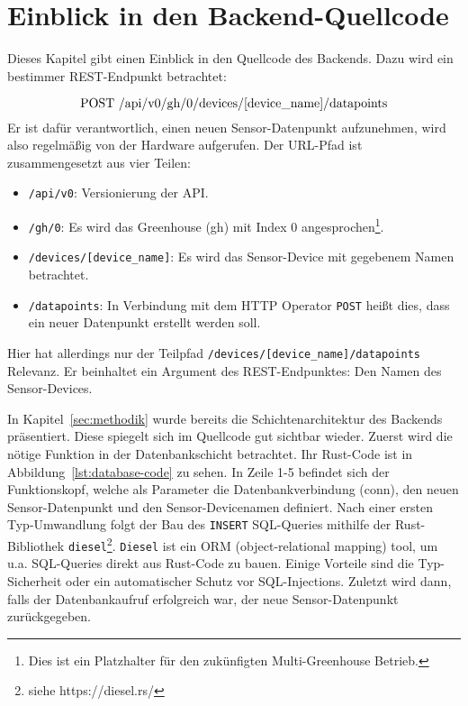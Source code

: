 \section{Einblick in den Backend-Quellcode}
    Dieses Kapitel gibt einen Einblick in den Quellcode des Backends.
    Dazu wird ein bestimmer REST-Endpunkt betrachtet:

    $$
        \text{\lstinline{POST /api/v0/gh/0/devices/[device_name]/datapoints}}
    $$
    Er ist dafür verantwortlich, einen neuen Sensor-Datenpunkt aufzunehmen, wird also regelmäßig von der Hardware aufgerufen.
    Der URL-Pfad ist zusammengesetzt aus vier Teilen:
    \begin{itemize}
        \item \lstinline{/api/v0}: Versionierung der API.
        \item \lstinline{/gh/0}: Es wird das Greenhouse (gh) mit Index 0 angesprochen\footnote{Dies ist ein Platzhalter für den zukünfigten Multi-Greenhouse Betrieb.}.
        \item \lstinline{/devices/[device_name]}: Es wird das Sensor-Device mit gegebenem Namen betrachtet.
        \item \lstinline{/datapoints}: In Verbindung mit dem HTTP Operator \lstinline{POST} heißt dies, dass ein neuer Datenpunkt erstellt werden soll.
    \end{itemize}
    Hier hat allerdings nur der Teilpfad \lstinline{/devices/[device_name]/datapoints} Relevanz.
    Er beinhaltet ein Argument des REST-Endpunktes: Den Namen des Sensor-Devices.

    In Kapitel~\ref{sec:methodik} wurde bereits die Schichtenarchitektur des Backends präsentiert.
    Diese spiegelt sich im Quellcode gut sichtbar wieder.
    Zuerst wird die nötige Funktion in der Datenbankschicht betrachtet.
    Ihr Rust-Code ist in Abbildung~\ref{lst:database-code} zu sehen.
    In Zeile 1-5 befindet sich der Funktionskopf, welche als Parameter die Datenbankverbindung (conn), den neuen Sensor-Datenpunkt und den Sensor-Devicenamen definiert.
    Nach einer ersten Typ-Umwandlung folgt der Bau des \lstinline{INSERT} SQL-Queries mithilfe der Rust-Bibliothek \lstinline{diesel}\footnote{siehe https://diesel.rs/}.
    \lstinline{Diesel} ist ein ORM (object-relational mapping) tool, um u.a. SQL-Queries direkt aus Rust-Code zu bauen.
    Einige Vorteile sind die Typ-Sicherheit oder ein automatischer Schutz vor SQL-Injections.
    Zuletzt wird dann, falls der Datenbankaufruf erfolgreich war, der neue Sensor-Datenpunkt zurückgegeben.

